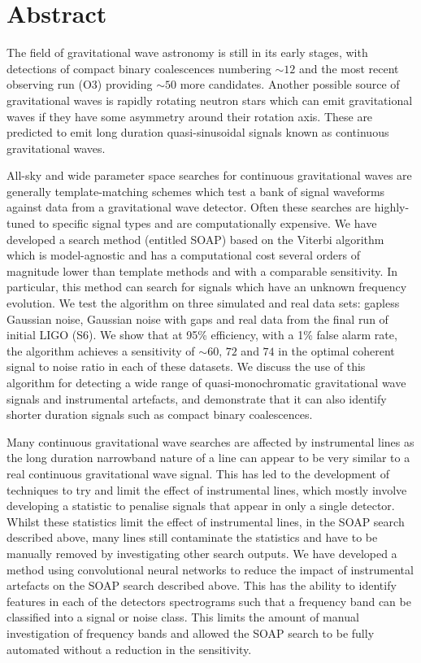 \chapter{Abstract}

The field of gravitational wave astronomy is still in its early stages, with
detections of compact binary coalescences numbering $\sim
12$ and the most recent observing run (O3) providing $\sim 50$ more candidates. Another possible source of
gravitational waves is rapidly rotating neutron stars which can emit gravitational waves if they have some asymmetry
around their rotation axis.
These are predicted to emit long duration quasi-sinusoidal signals known as
continuous gravitational waves.

All-sky and wide parameter space searches for continuous gravitational waves
are generally template-matching schemes which test a bank of signal waveforms
against data from a gravitational wave detector.  Often these searches  are highly-tuned to specific signal types and are computationally
expensive. We have developed a search method (entitled SOAP) based on the Viterbi
algorithm which is model-agnostic and has a computational cost several orders
of magnitude lower than template methods and with a comparable sensitivity. 
In particular, this method can search for
signals which have an unknown frequency evolution. We test the algorithm on
three simulated and real data sets: gapless Gaussian noise, Gaussian noise with
gaps and real data from the final run of initial LIGO (S6). We show that at
95\% efficiency, with a 1\% false alarm rate, the algorithm achieves a sensitivity of $\sim 60,\, 72$ and $74$ in the optimal coherent signal to noise ratio in each of these datasets.
We discuss the use of this algorithm for detecting a wide range of quasi-monochromatic
gravitational wave signals and instrumental artefacts, and
demonstrate that it can also identify shorter duration signals such as compact binary coalescences.


Many continuous gravitational wave searches are affected by instrumental lines
as the long duration narrowband nature of a line can appear to be very similar
to a real continuous gravitational wave signal.  This has led
to the development of techniques to try and limit the effect of
instrumental lines, which mostly involve developing a statistic to penalise
signals that appear in only a single detector.  
Whilst these statistics limit the effect of instrumental lines, in the SOAP search described above, many lines still contaminate the statistics and have to be manually removed by investigating other search outputs.
We have developed a method using convolutional neural networks to reduce the impact of instrumental
artefacts on the SOAP search described above.  This has the
ability to identify features in each of the detectors spectrograms such that a
frequency band can be classified into a signal or noise class.  
This limits the amount of manual investigation of frequency bands and allowed the SOAP search to be fully automated without a reduction in the sensitivity.



